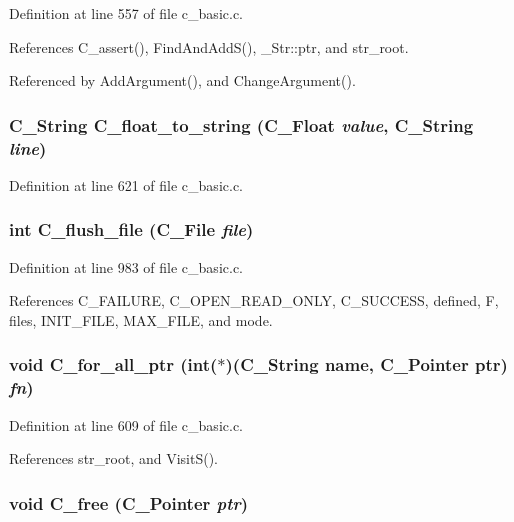 Definition at line 557 of file c\_\-basic.c.

References C\_\-assert(), Find\-And\-Add\-S(), \_\-Str::ptr, and str\_\-root.

Referenced by Add\-Argument(), and Change\-Argument().
\subsubsection{\setlength{\rightskip}{0pt plus 5cm}\bf{C\_\-String} C\_\-float\_\-to\_\-string (\bf{C\_\-Float} {\em value}, \bf{C\_\-String} {\em line})}\label{c__basic_8h_54cde48b77c2ccececa4698b6fe2d79b}




Definition at line 621 of file c\_\-basic.c.
\subsubsection{\setlength{\rightskip}{0pt plus 5cm}int C\_\-flush\_\-file (\bf{C\_\-File} {\em file})}\label{c__basic_8h_01d7ce07875dd7a35486434c641b0b9d}




Definition at line 983 of file c\_\-basic.c.

References C\_\-FAILURE, C\_\-OPEN\_\-READ\_\-ONLY, C\_\-SUCCESS, defined, F, files, INIT\_\-FILE, MAX\_\-FILE, and mode.
\subsubsection{\setlength{\rightskip}{0pt plus 5cm}void C\_\-for\_\-all\_\-ptr (int($\ast$)(\bf{C\_\-String} \bf{name}, \bf{C\_\-Pointer} ptr) {\em fn})}\label{c__basic_8h_4164cf8a2b1dc649057072e0aa3095a2}




Definition at line 609 of file c\_\-basic.c.

References str\_\-root, and Visit\-S().
\subsubsection{\setlength{\rightskip}{0pt plus 5cm}void C\_\-free (\bf{C\_\-Pointer} {\em ptr})}\label{c__basic_8h_c4f36c66a129f1ab02a3a5bd73d34321}




